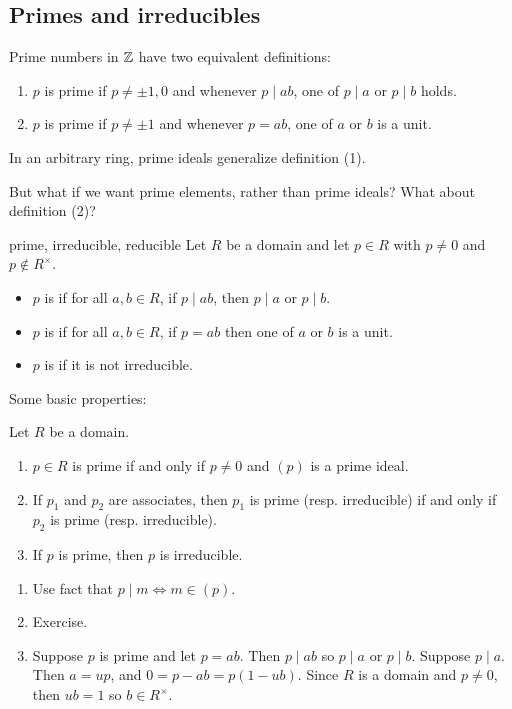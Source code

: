 \documentclass[12pt,letterpaper]{report}
\begin{document}
\subsection{Primes and irreducibles}

Prime numbers in $\mathbb{Z}$ have two equivalent definitions:
\begin{enumerate}
  \item $p$ is prime if $p \neq \pm 1, 0$ and whenever $p \mid ab$, one of $p \mid a$ or $p \mid b$
    holds.
  \item $p$ is prime if $p \neq \pm 1$ and whenever $p = ab$, one of $a$ or $b$ is a unit.
\end{enumerate}

In an arbitrary ring, prime ideals generalize definition (1).

But what if we want prime elements, rather than prime ideals?
What about definition (2)?

\begin{defn}{prime, irreducible, reducible}{}
  Let $R$ be a domain and let $p \in R$ with $p \neq 0$ and $p \not\in R^\times$.
  \begin{itemize}
    \item $p$ is  if for all $a, b \in R$, if $p \mid ab$, then $p \mid a$ or
      $p \mid b$.
    \item $p$ is  if for all $a, b \in R$, if $p = ab$ then one of $a$ or $b$
      is a unit.
    \item $p$ is  if it is not irreducible.
  \end{itemize}
\end{defn}

Some basic properties:

\begin{prop}{}{}
  Let $R$ be a domain.
  \begin{enumerate}
    \item $p \in R$ is prime if and only if $p \neq 0$ and $(p)$ is a prime ideal.
    \item If $p_1$ and $p_2$ are associates, then $p_1$ is prime (resp. irreducible) if and only if
      $p_2$ is prime (resp. irreducible).
    \item If $p$ is prime, then $p$ is irreducible.
  \end{enumerate}
\end{prop}

\begin{thmproof}
  \begin{enumerate}
    \item Use fact that $p \mid m \iff m \in (p)$.
    \item Exercise.
    \item Suppose $p$ is prime and let $p = ab$.
      Then $p \mid ab$ so $p \mid a$ or $p \mid b$.
      Suppose $p \mid a$.
      Then $a = up$, and $0 = p - ab = p(1 - ub)$.
      Since $R$ is a domain and $p \neq 0$, then $ub = 1$ so $b \in R^\times$.
  \end{enumerate}
\end{thmproof}
\end{document}
